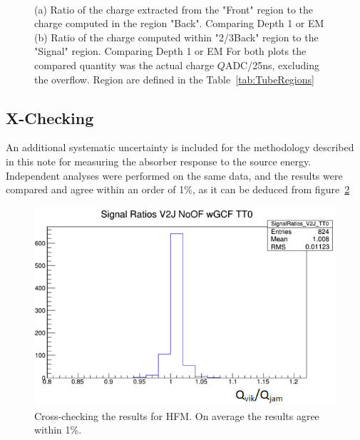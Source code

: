 \begin{figure}[!h]
    \begin{center}
        ~
        \caption
        {(a) Ratio of the charge extracted from the "Front" region to the charge
         computed in the region "Back". Comparing Depth 1 or EM
         (b) Ratio of the charge computed within "2/3Back" region to the "Signal"
         region. Comparing Depth 1 or EM
         For both plots the compared quantity was the actual charge
         $Q$ADC/25\unit{ns}, excluding the overflow. Region are
         defined in the Table~\ref{tab:TubeRegions}}
        \label{fig:HF_LongUni}
    \end{center}
\end{figure}

\subsection{X-Checking}
An additional systematic uncertainty is included for the
methodology described in this note for measuring the absorber response to the source energy. Independent analyses were performed on the same data, and the results were compared and agree within an order of 1\%, as it can be deduced from figure~\ref{fig:Crosscheck}
\begin{figure}[!h]
    \begin{center}
        \includegraphics[width=.5\textwidth]{figures/ch_hfcalibration/Crosscheck.png}
        \caption{Cross-checking the results for HFM. On average the results agree
        within 1\%.}
        \label{fig:Crosscheck}
    \end{center}
\end{figure}